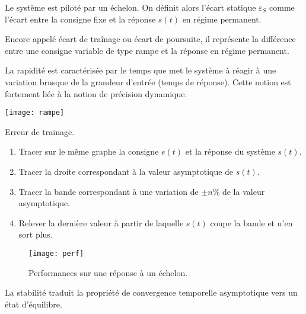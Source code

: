 \vspace{.1cm}

\begin{defi}
Le système est piloté par un échelon. On définit alors l'écart statique $\varepsilon_S$ comme l'écart entre la consigne fixe et la réponse $s(t)$ en régime permanent.
\end{defi}

\begin{defi}
Encore appelé écart de traînage ou écart de poursuite, il représente la différence entre une consigne variable de type rampe et la réponse en régime permanent. 
\end{defi}

\begin{defi}[Rapidité]

La rapidité est caractérisée par le temps que met le système à réagir à une
variation brusque de la grandeur d'entrée (temps de réponse). Cette notion est
fortement liée à la notion de précision dynamique.
\end{defi}

\begin{marginfigure}[-2cm]
\texttt{[image: rampe]}
\caption{Erreur de trainage.}
\end{marginfigure}


\begin{methode}%

\begin{enumerate}
 \item Tracer sur le même graphe la consigne $e(t)$ et la réponse du système
$s(t)$.
\item Tracer la droite correspondant à la valeur asymptotique de $s(t)$.
\item Tracer la bande correspondant à une variation de $\pm n\%$ de la valeur
asymptotique.
\item Relever la dernière valeur à partir de laquelle $s(t)$ coupe la bande et
n'en sort plus.
\end{enumerate}
\end{methode}


\begin{figure}[!h]
\centering
\texttt{[image: perf]}
\caption{Performances sur une réponse à un échelon.}
\end{figure}

\begin{defi}[Stabilité]

La stabilité traduit la propriété de convergence temporelle asymptotique vers
un état d'équilibre. 
\end{defi}



